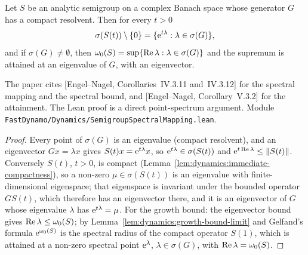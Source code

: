\begin{theorem}
  \label{thm:dynamics:spectral-mapping}
  \leanok
  Let $S$ be an analytic semigroup on a complex Banach space whose generator $G$ has a compact
  resolvent.  Then for every $t>0$
  \[
    \sigma(S(t))\setminus\{0\}=\{\mathrm{e}^{t\lambda}:\lambda\in\sigma(G)\},
  \]
  and if $\sigma(G)\neq\emptyset$, then
  $\omega_0(S)=\sup\{\operatorname{Re}\lambda:\lambda\in\sigma(G)\}$ and the supremum is attained at an
  eigenvalue of $G$, with an eigenvector.
\end{theorem}

The paper cites [Engel--Nagel, Corollaries~IV.3.11 and~IV.3.12] for the spectral mapping and
the spectral bound, and [Engel--Nagel, Corollary~V.3.2] for the attainment.  The Lean proof is a
direct point-spectrum argument.  Module \texttt{FastDynamo/Dynamics/SemigroupSpectralMapping.lean}.

\begin{proof}
  \leanok
  Every point of $\sigma(G)$ is an eigenvalue (compact resolvent), and an eigenvector
  $Gx=\lambda x$ gives $S(t)x=\mathrm{e}^{t\lambda}x$, so $\mathrm{e}^{t\lambda}\in\sigma(S(t))$ and
  $\mathrm{e}^{t\operatorname{Re}\lambda}\leq\left\|S(t)\right\|$.  Conversely $S(t)$, $t>0$, is compact
  (Lemma~\ref{lem:dynamics:immediate-compactness}), so a non-zero $\mu\in\sigma(S(t))$ is an
  eigenvalue with finite-dimensional eigenspace; that eigenspace is invariant under the bounded
  operator $GS(t)$, which therefore has an eigenvector there, and it is an eigenvector of $G$
  whose eigenvalue $\lambda$ has $\mathrm{e}^{t\lambda}=\mu$.  For the growth bound: the eigenvector
  bound gives $\operatorname{Re}\lambda\leq\omega_0(S)$; by Lemma~\ref{lem:dynamics:growth-bound-limit} and
  Gelfand's formula $\mathrm{e}^{\omega_0(S)}$ is the spectral radius of the compact operator $S(1)$,
  which is attained at a non-zero spectral point $\mathrm{e}^\lambda$, $\lambda\in\sigma(G)$, with
  $\operatorname{Re}\lambda=\omega_0(S)$.
\end{proof}


